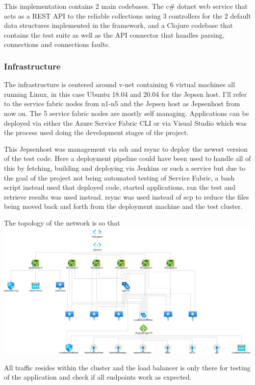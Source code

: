 \documentclass[a4paper,10pt,titlepage]{report}
\begin{document}
    This implementation contains 2 main codebases. The c\# dotnet web service that acts as a REST API to the reliable collections using 3 controllers for the 2 default data structures implemented in the framework, and a Clojure codebase that contains the test suite as well as the API connector that handles parsing, connections and connections faults.

    \subsubsection{Infrastructure}
    The infrastructure is centered around v-net containing 6 virtual machines all running Linux, in this case Ubuntu 18.04 and 20.04 for the Jepsen host. I'll refer to the service fabric nodes from n1-n5 and the Jepsen host as Jepsenhost from now on.
    The 5 service fabric nodes are mostly self managing. Applications can be deployed via either the Azure Service Fabric CLI\cite{servicefabriccli} or via Visual Studio\cite{servicefabricguide} which was the process used doing the development stages of the project.

    This Jepsenhost was management via ssh and rsync to deploy the newest version of the test code. Here a deployment pipeline could have been used to handle all of this by fetching, building and deploying via Jenkins or such a service but due to the goal of the project not being automated testing of Service Fabric, a bash script instead used that deployed code, started applications, ran the test and retrieve results was used instead. rsync was used instead of scp to reduce the files being moved back and forth from the deployment machine and the test cluster.

    The topology of the network is so that \\
    \includegraphics[scale=0.3]{images/topology.png}

    All traffic resides within the cluster and the load balancer is only there for testing of the application and check if all endpoints work as expected.
\end{document}
